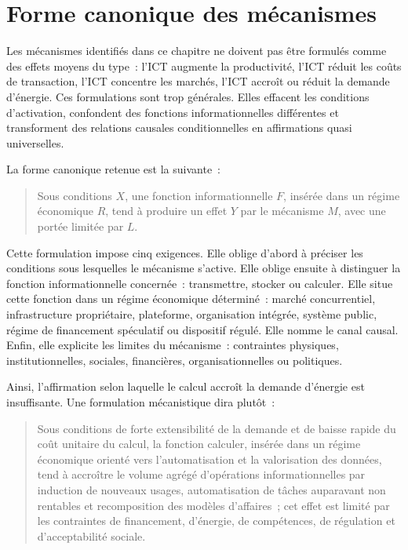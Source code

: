 \section{Forme canonique des mécanismes}

Les mécanismes identifiés dans ce chapitre ne doivent pas être formulés comme des effets moyens du type~: l'ICT augmente la productivité, l'ICT réduit les coûts de transaction, l'ICT concentre les marchés, l'ICT accroît ou réduit la demande d'énergie. Ces formulations sont trop générales. Elles effacent les conditions d'activation, confondent des fonctions informationnelles différentes et transforment des relations causales conditionnelles en affirmations quasi universelles.

La forme canonique retenue est la suivante~:

\begin{quote}
Sous conditions \(X\), une fonction informationnelle \(F\), insérée dans un régime économique \(R\), tend à produire un effet \(Y\) par le mécanisme \(M\), avec une portée limitée par \(L\).
\end{quote}

Cette formulation impose cinq exigences. Elle oblige d'abord à préciser les conditions sous lesquelles le mécanisme s'active. Elle oblige ensuite à distinguer la fonction informationnelle concernée~: transmettre, stocker ou calculer. Elle situe cette fonction dans un régime économique déterminé~: marché concurrentiel, infrastructure propriétaire, plateforme, organisation intégrée, système public, régime de financement spéculatif ou dispositif régulé. Elle nomme le canal causal. Enfin, elle explicite les limites du mécanisme~: contraintes physiques, institutionnelles, sociales, financières, organisationnelles ou politiques.

Ainsi, l'affirmation selon laquelle le calcul accroît la demande d'énergie est insuffisante. Une formulation mécanistique dira plutôt~:

\begin{quote}
Sous conditions de forte extensibilité de la demande et de baisse rapide du coût unitaire du calcul, la fonction calculer, insérée dans un régime économique orienté vers l'automatisation et la valorisation des données, tend à accroître le volume agrégé d'opérations informationnelles par induction de nouveaux usages, automatisation de tâches auparavant non rentables et recomposition des modèles d'affaires~; cet effet est limité par les contraintes de financement, d'énergie, de compétences, de régulation et d'acceptabilité sociale.
\end{quote}


